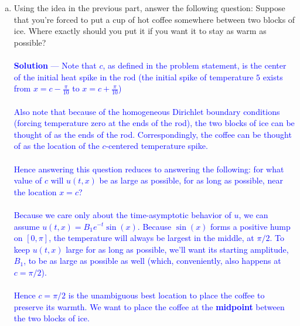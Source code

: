 \documentclass[12pt]{article}
\begin{document}
\begin{enumerate}[(a)]
{$$u(t,x) \sim \underbrace{\frac{20\sin(c)}{\pi} \sin \left( \frac{\pi}{10} \right)}_{B_1} e^{-t} \sin (x)$$
Maximize $B_1 \implies$ maximize $\sin(c) \implies$ get $c$ as close to $\pi/2$ as possible. Since $\pi/2$ is already in the defined range of $\frac{\pi}{10} < c < \frac{9\pi}{10}$, we can just choose $c = \pi/2$.
}
\item Using the idea in the previous part, answer the following question:
Suppose that you're forced to put a cup of hot coffee somewhere between two blocks of ice. Where exactly should you put it if you want it to stay as warm as possible? \\ \\
\textcolor{blue}{\textbf{Solution} — Note that $c$, as defined in the problem statement, is the center of the initial heat spike in the rod (the initial spike of temperature $5$ exists from $x = c - \frac{\pi}{10}$ to $x = c + \frac{\pi}{10}$) \\ \\
Also note that because of the homogeneous Dirichlet boundary conditions (forcing temperature zero at the ends of the rod), the two blocks of ice can be thought of as the ends of the rod. Correspondingly, the coffee can be thought of as the location of the $c$-centered temperature spike. \\ \\ Hence answering this question reduces to answering the following: for what value of $c$ will $u(t,x)$ be as large as possible, for as long as possible, near the location $x=c$? \\ \\
Because we care only about the time-asymptotic behavior of $u$, we can assume $u(t,x) = B_1 e^{-t} \sin(x)$. Because $\sin(x)$ forms a positive hump on $[0, \pi]$, the temperature will always be largest in the middle, at $\pi/2$. To keep $u(t,x)$ large for as long as possible, we'll want its starting amplitude, $B_1$, to be as large as possible as well (which, conveniently, also happens at $c = \pi/2$). \\ \\
Hence $c = \pi/2$ is the unambiguous best location to place the coffee to preserve its warmth. We want to place the coffee at the \textbf{midpoint} between the two blocks of ice.
}
\end{enumerate}


\vspace{0.3in}
\end{document}
